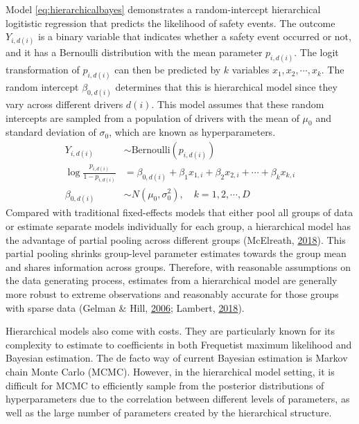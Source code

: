 \documentclass[12pt]{book}
\numberwithin{equation}{chapter}
\begin{document}
Model \eqref{eq:hierarchicalbayes} demonstrates a random-intercept hierarchical logitistic regression that predicts the likelihood of safety events. The outcome \(Y_{i, d(i)}\) is a binary variable that indicates whether a safety event occurred or not, and it has a Bernoulli distribution with the mean parameter \(p_{i, d(i)}\). The logit transformation of \(p_{i, d(i)}\) can then be predicted by \(k\) variables \(x_1, x_2, \cdots, x_k\). The random intercept \(\beta_{0, d(i)}\) determines that this is hierarchical model since they vary across different drivers \(d(i)\). This model assumes that these random intercepts are sampled from a population of drivers with the mean of \(\mu_0\) and standard deviation of \(\sigma_0\), which are known as hyperparameters.
\begin{equation}
\begin{split}
Y_{i, d(i)} &\sim \text{Bernoulli}(p_{i, d(i)})\\
\log\frac{p_{i, d(i)}}{1-p_{i, d(i)}} &= \beta_{0, d(i)} + \beta_1x_{1,i} + \beta_2x_{2,i} + \cdots + \beta_kx_{k,i}\\
\beta_{0, d(i)} &\sim N(\mu_0, \sigma_0^2), \quad k = 1, 2, \cdots, D
\label{eq:hierarchicalbayes}
\end{split}
\end{equation}
Compared with traditional fixed-effects models that either pool all groups of data or estimate separate models individually for each group, a hierarchical model has the advantage of partial pooling across different groups (McElreath, \protect\hyperlink{ref-mcelreath2018statistical}{2018}). This partial pooling shrinks group-level parameter estimates towards the group mean and shares information across groups. Therefore, with reasonable assumptions on the data generating process, estimates from a hierarchical model are generally more robust to extreme observations and reasonably accurate for those groups with sparse data (Gelman \& Hill, \protect\hyperlink{ref-gelman2006data}{2006}; Lambert, \protect\hyperlink{ref-lambert2018student}{2018}).

Hierarchical models also come with costs. They are particularly known for its complexity to estimate to coefficients in both Frequetist maximum likelihood and Bayesian estimation. The de facto way of current Bayesian estimation is Markov chain Monte Carlo (MCMC). However, in the hierarchical model setting, it is difficult for MCMC to efficiently sample from the posterior distributions of hyperparameters due to the correlation between different levels of parameters, as well as the large number of parameters created by the hierarchical structure.
\end{document}
